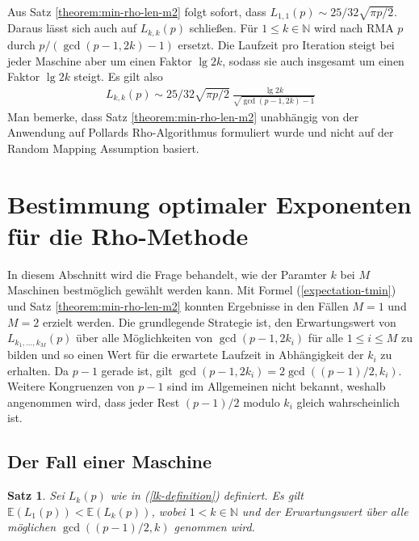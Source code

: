 \documentclass[a4paper, 11pt, ngerman]{article}
\newcommand{\E}{\mathbb{E}}
\newcommand{\N}{\mathbb{N}}
\newtheorem{theorem}{Satz}
\begin{document}
\noindent Aus Satz \ref{theorem:min-rho-len-m2} folgt sofort, dass $L_{1, 1}(p) \sim 25/32 \sqrt{\pi p / 2}$. Daraus lässt sich auch auf $L_{k, k}(p)$ schließen. Für $1 \le k \in \N$ wird nach RMA $p$ durch $p/(\gcd(p - 1, 2k) - 1)$ ersetzt. Die Laufzeit pro Iteration steigt bei jeder Maschine aber um einen Faktor $\lg 2k$, sodass sie auch insgesamt um einen Faktor $\lg 2k$ steigt. Es gilt also
\begin{align}
    L_{k, k}(p) \sim 25 / 32 \sqrt{\pi p /2} \
    \frac {\lg 2k} {\sqrt{\gcd(p - 1, 2k) - 1}}
    \label{lkkp}
\end{align}
Man bemerke, dass Satz \ref{theorem:min-rho-len-m2} unabhängig von der Anwendung auf Pollards Rho-Algorithmus formuliert wurde und nicht auf der Random Mapping Assumption basiert.

\section{Bestimmung optimaler Exponenten für die Rho-Methode}
\label{sec:optimal-k}

In diesem Abschnitt wird die Frage behandelt, wie der Paramter $k$ bei $M$ Maschinen bestmöglich gewählt werden kann. Mit Formel (\ref{expectation-tmin}) und Satz \ref{theorem:min-rho-len-m2} konnten Ergebnisse in den Fällen $M = 1$ und $M = 2$ erzielt werden. Die grundlegende Strategie ist, den Erwartungswert von $L_{k_1, \dots, k_M}(p)$ über alle Möglichkeiten von $\gcd(p - 1, 2k_i)$ für alle $1 \le i \le M$ zu bilden und so einen Wert für die erwartete Laufzeit in Abhängigkeit der $k_i$ zu erhalten. Da $p - 1$ gerade ist, gilt $\gcd(p-1, 2k_i) = 2\gcd((p - 1)/2, k_i)$. Weitere Kongruenzen von $p - 1$ sind im Allgemeinen nicht bekannt, weshalb angenommen wird, dass jeder Rest $(p- 1)/2$ modulo $k_i$ gleich wahrscheinlich ist.

\subsection{Der Fall einer Maschine}

\begin{theorem}
    \label{theorem:optimal-k-m1}
    Sei $L_k(p)$ wie in (\ref{lk-definition}) definiert. Es gilt $\E(L_1(p)) < \E(L_k(p))$, wobei $1 < k \in \N$ und der Erwartungswert über alle möglichen $\gcd((p - 1)/2, k)$ genommen wird.
\end{theorem}
\end{document}
